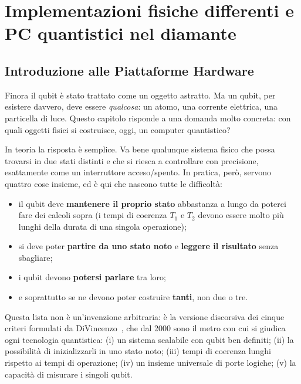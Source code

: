 \chapter{Implementazioni fisiche differenti e PC quantistici nel diamante}
\label{chap:implementazioni}

\section{Introduzione alle Piattaforme Hardware}
\label{sec:intro-hw}

Finora il qubit è stato trattato come un oggetto astratto. Ma un qubit, per
esistere davvero, deve essere \textit{qualcosa}: un atomo, una corrente
elettrica, una particella di luce. Questo capitolo risponde a una domanda molto
concreta: con quali oggetti fisici si costruisce, oggi, un computer quantistico?

In teoria la risposta è semplice. Va bene qualunque sistema fisico che possa
trovarsi in due stati distinti e che si riesca a controllare con precisione,
esattamente come un interruttore acceso/spento. In pratica, però, servono
quattro cose insieme, ed è qui che nascono tutte le difficoltà:

\begin{itemize}
  \item il qubit deve \textbf{mantenere il proprio stato} abbastanza a lungo da
    poterci fare dei calcoli sopra (i tempi di coerenza $T_1$ e $T_2$ devono
    essere molto più lunghi della durata di una singola operazione);
  \item si deve poter \textbf{partire da uno stato noto} e \textbf{leggere il
    risultato} senza sbagliare;
  \item i qubit devono \textbf{potersi parlare} tra loro;
  \item e soprattutto se ne devono poter costruire \textbf{tanti}, non due o tre.
\end{itemize}

Questa lista non è un'invenzione arbitraria: è la versione discorsiva dei
cinque criteri formulati da DiVincenzo~\cite{divincenzo2000physical}, che dal
2000 sono il metro con cui si giudica ogni tecnologia quantistica: (i) un
sistema scalabile con qubit ben definiti; (ii) la possibilità di inizializzarli
in uno stato noto; (iii) tempi di coerenza lunghi rispetto ai tempi di
operazione; (iv) un insieme universale di porte logiche; (v) la capacità di
misurare i singoli qubit.


